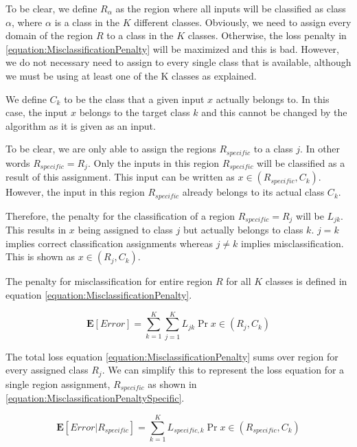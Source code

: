 \documentclass[a4paper,12pt]{article}
\begin{document}
To be clear, we define $R_{\alpha}$ as the region where all inputs will be classified as class $\alpha$, where $\alpha$ is a class in the $K$ different classes.
Obviously, we need to assign every domain of the region $R$ to a class in the $K$ classes. Otherwise, the loss penalty in \ref{equation:MisclassificationPenalty} will be maximized and this is bad. However, we do not necessary need to assign to every single class that is available, although we must be using at least one of the K classes as explained. 

We define $C_{k}$ to be the class that a given input $x$ actually belongs to. In this case, the input $x$ belongs to the target class $k$ and this cannot be changed by the algorithm as it is given as an input. 

To be clear, we are only able to assign the regions $R_{specific}$ to a class $j$. In other words $R_{specific} = R_{j}$. Only the inputs in this region $R_{specific}$ will be classified as a result of this assignment. This input can be written as $x \in (R_{specific}, C_{k})$. However, the input in this region $R_{specific}$ already belongs to its actual class $C_{k}$.

Therefore, the penalty for the classification of a region $R_{specific} = R_{j}$ will be $L_{jk}$. This results in $x$ being assigned to class $j$ but actually belongs to class $k$. $j=k$ implies correct classification assignments whereas $j \neq k$ implies misclassification. This is shown as $x \in (R_{j}, C_{k})$. 

The penalty for misclassification for entire region $R$ for all $K$ classes is defined in equation \ref{equation:MisclassificationPenalty}. 

\begin{equation}
\label{equation:MisclassificationPenalty}
\mathbf{E}[Error] = \sum_{k=1}^{K} \sum_{j=1}^{K} L_{jk} \Pr{x \in (R_{j}, C_{k})}
\end{equation}

The total loss equation \ref{equation:MisclassificationPenalty} sums over region for every assigned class $R_{j}$. We can simplify this to represent the loss equation for a single region assignment, $R_{specific}$ as shown in \ref{equation:MisclassificationPenaltySpecific}.

\begin{equation}
\label{equation:MisclassificationPenaltySpecific}
\mathbf{E}[Error | R_{specific}]  = \sum_{k=1}^{K} L_{specific,k} \Pr{x \in (R_{specific}, C_{k})}
\end{equation}
\end{document}
